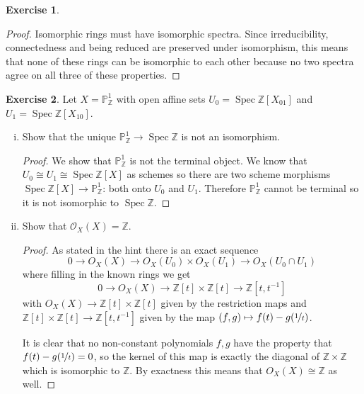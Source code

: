 \documentclass{article}
\newcommand{\Z}{\mathbb{Z}}
\newcommand{\proj}{\mathbb{P}}
\newcommand{\sheaf}{\mathcal{O}}
\DeclareMathOperator{\spec}{Spec}
\theoremstyle{definition}
\newtheorem{question}{Exercise}
\begin{document}
\begin{question}
\begin{enumerate}[(i)]
              \begin{proof}
                  Isomorphic rings must have isomorphic spectra. Since
                  irreducibility, connectedness and being reduced are preserved
                  under isomorphism, this means that none of these rings can be
                  isomorphic to each other because no two spectra agree on all
                  three of these properties.
              \end{proof}
    \end{enumerate}
\end{question}

\begin{question}
    Let \(X=\proj_{\Z}^{1}\) with open affine sets \(U_{0}=\spec\Z[X_{01}]\)
    and \(U_{1}=\spec\Z[X_{10}]\).

    \begin{enumerate}[(i)]
        \item Show that the unique \(\proj_{\Z}^{1}\to\spec\Z\) is not an
              isomorphism.

              \begin{proof}
                  We show that \(\proj_{\Z}^{1}\) is not the terminal object. We
                  know that \(U_{0}\cong U_{1}\cong\spec\Z[X]\) as schemes so
                  there are two scheme morphisms
                  \(\spec\Z[X]\to\proj_{\Z}^{1}\): both onto \(U_{0}\) and
                  \(U_{1}\). Therefore \(\proj_{\Z}^{1}\) cannot be terminal
                  so it is not isomorphic to \(\spec\Z\).
              \end{proof}

        \item Show that \(\sheaf_{X}(X)=\Z\).

              \begin{proof}
                  As stated in the hint there is an exact sequence
                  \[
                      0\to O_{X}(X)\to O_{X}(U_{0})\times O_{X}(U_{1})\to O_{X}(U_{0}\cap U_{1})
                  \]
                  where filling in the known rings we get
                  \[
                      0\to O_{X}(X)\to \Z[t]\times \Z[t]\to \Z[t,t^{-1}]
                  \]
                  with \(O_{X}(X)\to \Z[t]\times \Z[t]\) given by the
                  restriction maps and \(\Z[t]\times \Z[t]\to \Z[t,t^{-1}]\)
                  given by the map \((f,g)\mapsto f(t)-g(\nicefrac{1}{t})\).

                  It is clear that no non-constant polynomials \(f,g\) have the
                  property that \(f(t)-g(\nicefrac{1}{t})=0\), so the kernel of
                  this map is exactly the diagonal of \(\Z\times\Z\) which is
                  isomorphic to \(\Z\). By exactness this means that
                  \(O_{X}(X)\cong\Z\) as well.
              \end{proof}


\end{enumerate}
\end{question}
\end{document}
